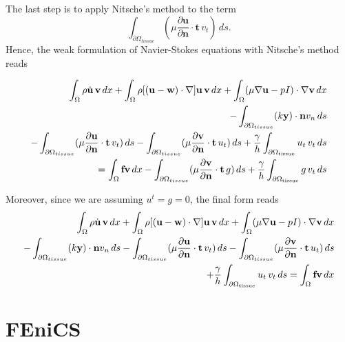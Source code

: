 \documentclass[11pt,a4paper,titlepage]{report}
\begin{document}
The last step is to apply Nitsche's method to the term
\[
\int_{\partial \Omega_{tissue}}(\mu \frac{\partial \mathbf{u}}{\partial \mathbf{n}} \cdot \mathbf{t} \, v_t) \, ds.
\]
Hence, the weak formulation of Navier-Stokes equations with Nitsche's method reads

\begin{align}
\label{eq:nitsche:6}
 \int_{\Omega} \rho \dot{\mathbf{u}} \, \mathbf{v} \, dx
+ \int_{\Omega} \rho [(\mathbf{u - w}) \cdot \nabla] \mathbf{u} \, \mathbf{v} \, dx
+ \int_{\Omega} (\mu \nabla \mathbf{u} - pI) \cdot \nabla \mathbf{v} \, dx \\
- \int_{\partial \Omega_{tissue}} (k \mathbf{y}) \cdot \mathbf{n} v_n \, ds \\
- \int_{\partial \Omega_{tissue}} (\mu \frac{\partial \mathbf{u}}{\partial \mathbf{n}} \cdot \mathbf{t} \, v_t) \, ds 
- \int_{\partial \Omega_{tissue}} (\mu \frac{\partial \mathbf{v}}{\partial \mathbf{n}} \cdot \mathbf{t} \, u_t) \, ds 
+ \frac{\gamma}{h} \int_{\partial \Omega_{\rm tissue}} u_t \, v_t \, ds \\
= \int_{\Omega} \mathbf{f} \mathbf{v} \, dx
- \int_{\partial \Omega_{tissue}} (\mu \frac{\partial \mathbf{v}}{\partial \mathbf{n}} \cdot \mathbf{t} \, g) \, ds 
+ \frac{\gamma}{h} \int_{\partial \Omega_{\rm tissue}} g \, v_t \, ds
\end{align} 

Moreover, since we are assuming $u^t = g = 0$, the final form reads
\begin{align*}
 \int_{\Omega} \rho \dot{\mathbf{u}} \, \mathbf{v} \, dx
+ \int_{\Omega} \rho [(\mathbf{u - w}) \cdot \nabla] \mathbf{u} \, \mathbf{v} \, dx
+ \int_{\Omega} (\mu \nabla \mathbf{u} - pI) \cdot \nabla \mathbf{v} \, dx \\
- \int_{\partial \Omega_{tissue}} (k \mathbf{y}) \cdot \mathbf{n} v_n \, ds 
- \int_{\partial \Omega_{tissue}} (\mu \frac{\partial \mathbf{u}}{\partial \mathbf{n}} \cdot \mathbf{t} \, v_t) \, ds 
- \int_{\partial \Omega_{tissue}} (\mu \frac{\partial \mathbf{v}}{\partial \mathbf{n}} \cdot \mathbf{t} \, u_t) \, ds  \\
+ \frac{\gamma}{h} \int_{\partial \Omega_{\rm tissue}} u_t \, v_t \, ds 
= \int_{\Omega} \mathbf{f} \mathbf{v} \, dx
\end{align*}


\section{FEniCS}
\end{document}
